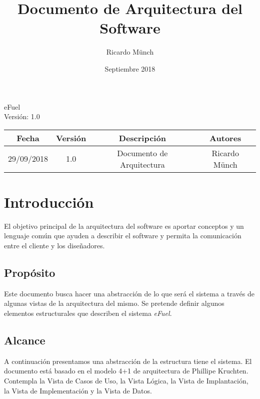 \documentclass{article}
\title{Documento de Arquitectura del Software} \let\Title\@title
\date{Septiembre 2018} \let\Date\@date
\author{Ricardo Münch} \let\Author\@author
\begin{document}
    \begin{titlepage}
        \huge{\Title}
        \begin{flushright}
            \Large{eFuel \\ Versión: 1.0}
        \end{flushright}
    \end{titlepage}

    \restoregeometry

    \newpage
    \tableofcontents

    \newpage
    \listoffigures
    \begingroup
    \let\clearpage\relax
    \listoftables
    \endgroup


    \newpage
    \begin{center}
        \begin{tabular}{ |c|c|c|c| }
            \hline
            \rowcolor{gray!30}
            Fecha & Versión & Descripción & Autores \\ [0.5ex]
            \hline\hline
            29/09/2018 & 1.0 & Documento de Arquitectura & Ricardo Münch \\
            \hline
        \end{tabular}
    \end{center}

    \newpage
    \section{Introducción}
    El objetivo principal de la arquitectura del software es aportar conceptos y un lenguaje común que ayuden a describir el software y permita la comunicación entre el cliente y los diseñadores.

    \subsection{Propósito}
    Este documento busca hacer una abstracción de lo que será el sistema a través de algunas vistas de la arquitectura del mismo. Se pretende definir algunos elementos estructurales que describen el sistema \emph{eFuel}.

    \subsection{Alcance}
    A continuación presentamos una abstracción de la estructura tiene el sistema. El documento está basado en el modelo 4+1 de arquitectura de Phillipe Kruchten. Contempla la Vista de Casos de Uso, la Vista Lógica, la Vista de Implantación, la Vista de Implementación y la Vista de Datos.
\end{document}
